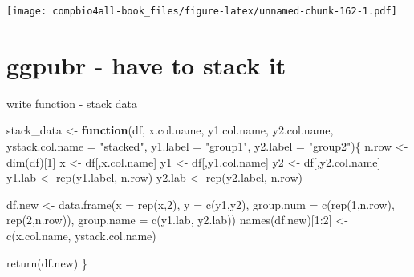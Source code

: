 \documentclass[
]{book}
\newenvironment{Shaded}{\begin{snugshade}}{\end{snugshade}}
\newcommand{\AttributeTok}[1]{\textcolor[rgb]{0.77,0.63,0.00}{#1}}
\newcommand{\ControlFlowTok}[1]{\textcolor[rgb]{0.13,0.29,0.53}{\textbf{#1}}}
\newcommand{\DecValTok}[1]{\textcolor[rgb]{0.00,0.00,0.81}{#1}}
\newcommand{\FunctionTok}[1]{\textcolor[rgb]{0.00,0.00,0.00}{#1}}
\newcommand{\NormalTok}[1]{#1}
\newcommand{\OtherTok}[1]{\textcolor[rgb]{0.56,0.35,0.01}{#1}}
\newcommand{\SpecialCharTok}[1]{\textcolor[rgb]{0.00,0.00,0.00}{#1}}
\newcommand{\StringTok}[1]{\textcolor[rgb]{0.31,0.60,0.02}{#1}}
\begin{document}
\texttt{[image: compbio4all-book\_files/figure-latex/unnamed-chunk-162-1.pdf]}

\hypertarget{ggpubr---have-to-stack-it}{%
\section{ggpubr - have to stack it}\label{ggpubr---have-to-stack-it}}

write function - stack data

\begin{Shaded}
\begin{Highlighting}[]
\NormalTok{stack\_data }\OtherTok{\textless{}{-}} \ControlFlowTok{function}\NormalTok{(df, }
\NormalTok{                       x.col.name,}
\NormalTok{                       y1.col.name, }
\NormalTok{                       y2.col.name, }
                       \AttributeTok{ystack.col.name =} \StringTok{"stacked"}\NormalTok{,}
                       \AttributeTok{y1.label =} \StringTok{"group1"}\NormalTok{,}
                       \AttributeTok{y2.label =} \StringTok{"group2"}\NormalTok{)\{}
\NormalTok{  n.row }\OtherTok{\textless{}{-}} \FunctionTok{dim}\NormalTok{(df)[}\DecValTok{1}\NormalTok{]}
\NormalTok{  x }\OtherTok{\textless{}{-}}\NormalTok{ df[,x.col.name]}
\NormalTok{  y1 }\OtherTok{\textless{}{-}}\NormalTok{ df[,y1.col.name]}
\NormalTok{  y2 }\OtherTok{\textless{}{-}}\NormalTok{ df[,y2.col.name]}
\NormalTok{  y1.lab }\OtherTok{\textless{}{-}} \FunctionTok{rep}\NormalTok{(y1.label, n.row)}
\NormalTok{  y2.lab }\OtherTok{\textless{}{-}} \FunctionTok{rep}\NormalTok{(y2.label, n.row)}
  
\NormalTok{  df.new }\OtherTok{\textless{}{-}} \FunctionTok{data.frame}\NormalTok{(}\AttributeTok{x =} \FunctionTok{rep}\NormalTok{(x,}\DecValTok{2}\NormalTok{),}
                       \AttributeTok{y =} \FunctionTok{c}\NormalTok{(y1,y2),}
                       \AttributeTok{group.num =} \FunctionTok{c}\NormalTok{(}\FunctionTok{rep}\NormalTok{(}\DecValTok{1}\NormalTok{,n.row),}
                                      \FunctionTok{rep}\NormalTok{(}\DecValTok{2}\NormalTok{,n.row)),}
                       \AttributeTok{group.name =} \FunctionTok{c}\NormalTok{(y1.lab, y2.lab))}
  \FunctionTok{names}\NormalTok{(df.new)[}\DecValTok{1}\SpecialCharTok{:}\DecValTok{2}\NormalTok{] }\OtherTok{\textless{}{-}} \FunctionTok{c}\NormalTok{(x.col.name,}
\NormalTok{                     ystack.col.name)}
  
  \FunctionTok{return}\NormalTok{(df.new)}
\NormalTok{                       \}}
\end{Highlighting}
\end{Shaded}
\end{document}
